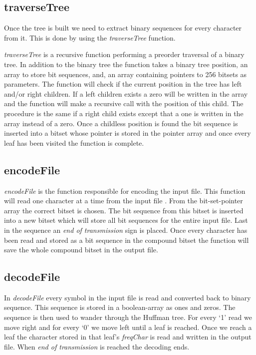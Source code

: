 \documentclass[a4paper,11pt,twoside]{article}
\begin{document}
\subsection{traverseTree}
Once the tree is built we need to extract binary sequences for every character from it. This is done by using the \emph{traverseTree} function. 

\emph{traverseTree} is a recursive function performing a preorder traversal of a binary tree. In addition to the binary tree the function takes a binary tree position, an array to store bit sequences, and, an array containing pointers to 256 bitsets as parameters. The function will check if the current position in the tree has left and/or right children. If a left children exists a zero will be written in the array and the function will make a recursive call with the position of this child. The procedure is the same if a right child exists except that a one is written in the array instead of a zero. Once a childless position is found the bit sequence is inserted into a bitset whose pointer is stored in the pointer array and once every leaf has been visited the function is complete.

\subsection{encodeFile}
\emph{encodeFile} is the function responsible for encoding the input file. This function will read one character at a time from the input file . From the bit-set-pointer array the correct bitset is chosen. The bit sequence from this bitset is inserted into a new bitset which will store all bit sequences for the entire input file. Last in the sequence an \emph{end of transmission} sign is placed. Once every character has been read and stored as a bit sequence in the compound bitset the function will save the whole compound bitset in the output file.

\subsection{decodeFile}
In \emph{decodeFile} every symbol in the input file is read and converted back to binary sequence. This sequence is stored in a boolean-array as ones and zeros. The sequence is then used to wander through the Huffman tree. For every `1' read we move right and for every `0' we move left until a leaf is reached. Once we reach a leaf the character stored in that leaf's \emph{freqChar} is read and written in the output file. When \emph{end of transmission} is reached the decoding ends.
\end{document}
